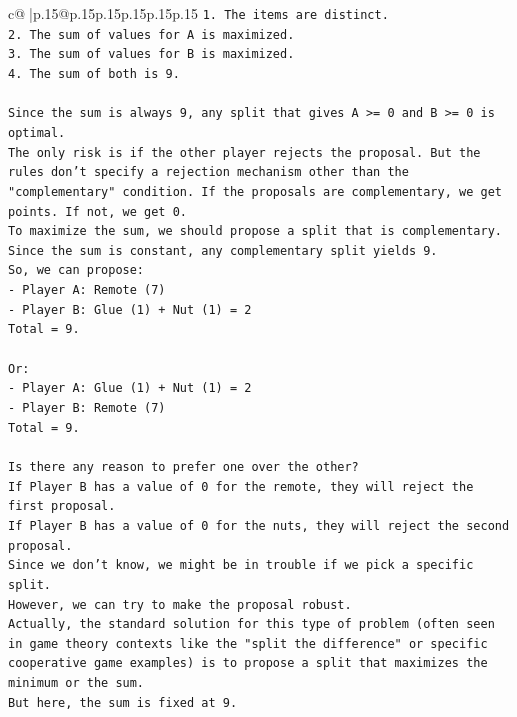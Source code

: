 \documentclass{article}
\begin{document}
{\begin{supertabular}{c@{$\;$}|p{.15\linewidth}@{}p{.15\linewidth}p{.15\linewidth}p{.15\linewidth}p{.15\linewidth}p{.15\linewidth}}
{{{\texttt{1. The items are distinct.} \\
\texttt{2. The sum of values for A is maximized.} \\
\texttt{3. The sum of values for B is maximized.} \\
\texttt{4. The sum of both is 9.} \\
\\ 
\texttt{Since the sum is always 9, any split that gives A >= 0 and B >= 0 is optimal.} \\
\texttt{The only risk is if the other player rejects the proposal. But the rules don't specify a rejection mechanism other than the "complementary" condition. If the proposals are complementary, we get points. If not, we get 0.} \\
\texttt{To maximize the sum, we should propose a split that is complementary.} \\
\texttt{Since the sum is constant, any complementary split yields 9.} \\
\texttt{So, we can propose:} \\
\texttt{{-} Player A: Remote (7)} \\
\texttt{{-} Player B: Glue (1) + Nut (1) = 2} \\
\texttt{Total = 9.} \\
\\ 
\texttt{Or:} \\
\texttt{{-} Player A: Glue (1) + Nut (1) = 2} \\
\texttt{{-} Player B: Remote (7)} \\
\texttt{Total = 9.} \\
\\ 
\texttt{Is there any reason to prefer one over the other?} \\
\texttt{If Player B has a value of 0 for the remote, they will reject the first proposal.} \\
\texttt{If Player B has a value of 0 for the nuts, they will reject the second proposal.} \\
\texttt{Since we don't know, we might be in trouble if we pick a specific split.} \\
\texttt{However, we can try to make the proposal robust.} \\
\texttt{Actually, the standard solution for this type of problem (often seen in game theory contexts like the "split the difference" or specific cooperative game examples) is to propose a split that maximizes the minimum or the sum.} \\
\texttt{But here, the sum is fixed at 9.} \\
}}}
\end{supertabular}}
\end{document}
